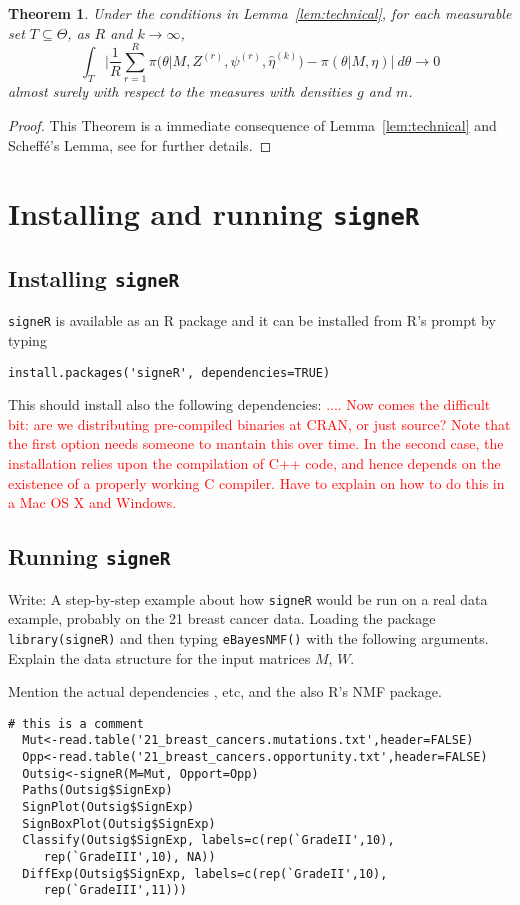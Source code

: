 \documentclass[11pt]{amsart}
\newtheorem{theorem}{Theorem}
\theoremstyle{definition}
\theoremstyle{remark}
\begin{document}
\begin{theorem} Under the conditions in Lemma~\ref{lem:technical}, for
  each measurable set $T\subseteq\Theta$, as $R$ and $k \to \infty$,
\[
  \int_T \bigg|
       \frac{1}{R}\sum_{r=1}^R \pi\big(\theta|M, Z^{(r)}, \psi^{(r)},
       \hat\eta^{(k)}\big) - \pi(\theta|M, \eta)
    \bigg|\ d\theta \to 0
\]
almost surely with respect to the measures with densities $g$  and
$m$.
\end{theorem}
\begin{proof}
This Theorem is a immediate consequence of Lemma~\ref{lem:technical}
and Scheff\'e's Lemma, see \cite{C01} for further details.
\end{proof}


\section{Installing and running \texttt{signeR}}
\subsection{Installing \texttt{signeR}}
\texttt{signeR} is available as an R package and it can be installed
from R's prompt by typing
\begin{lstlisting}[]
  install.packages('signeR', dependencies=TRUE)
\end{lstlisting}
This should install also the following dependencies: \textcolor{red}{....  Now comes
the difficult bit: are we distributing pre-compiled binaries at CRAN,
or just source? Note that the first option needs someone to mantain
this over time. In the second case, the installation relies upon the
compilation of C++ code, and hence depends on the existence of a
properly working C compiler. Have to explain on how to do this in a
Mac OS X and Windows.} 


\subsection{Running \texttt{signeR}}
Write: A step-by-step example about how \texttt{signeR} would be run
on a real data example, probably on the 21 breast cancer data.
Loading the package \verb+library(signeR)+ and then typing
\verb+eBayesNMF()+ with the following arguments. Explain the data
structure for the input matrices $M$, $W$.


Mention the actual dependencies \cite{Boo}, etc, and the also
R's NMF package.

\begin{lstlisting}[]
  # this is a comment
  Mut<-read.table('21_breast_cancers.mutations.txt',header=FALSE)
  Opp<-read.table('21_breast_cancers.opportunity.txt',header=FALSE)
  Outsig<-signeR(M=Mut, Opport=Opp)  
  Paths(Outsig$SignExp)
  SignPlot(Outsig$SignExp)
  SignBoxPlot(Outsig$SignExp)
  Classify(Outsig$SignExp, labels=c(rep(`GradeII',10),
     rep(`GradeIII',10), NA))
  DiffExp(Outsig$SignExp, labels=c(rep(`GradeII',10),
     rep(`GradeIII',11)))
\end{lstlisting}
\end{document}
